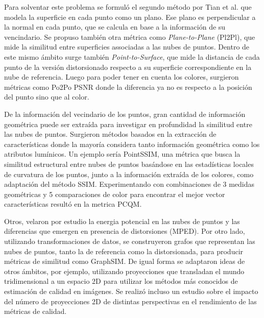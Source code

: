 Para solventar este problema se formuló el segundo método por Tian et al. 
que modela la superficie en cada punto como un plano. 
Ese plano es perpendicular a la normal en cada punto, que se calcula en base a la información de su vencindario. 
Se propuso también otra métrica como \emph{Plane-to-Plane} (Pl2Pl)\cite{PlaneToPlane}, 
que mide la similitud entre superficies associadas a las nubes de puntos. Dentro 
de este mismo ámbito surge también \emph{Point-to-Surface}\cite{PlaneToSurface}, 
que mide la distancia de cada punto de la versión distorsionado respecto a su 
superficie correspondiente en la nube de referencia. Luego para poder tener en
cuenta los colores, surgieron métricas como Po2Po PSNR donde la diferencia 
ya no es respecto a la posición del punto sino que al color.

De la información del vecindario de los puntos, gran cantidad de información geométrica 
puede ser extraída para investigar en profundidad la similitud entre las nubes 
de puntos. Surgieron métodos basados en la extracción de características donde la 
mayoría considera tanto información geométrica como los atributos lumínicos.
Un ejemplo sería PointSSIM\cite{PointSSIM}, una métrica que busca la similitud estructural entre nubes de puntos basándose en
las estadísticas locales de curvatura de los puntos, junto a la información 
extraída de los colores, como adaptación del método SSIM\cite{SSIM}.
Experimentando con combinaciones de 3 medidas geométricas y 5 comparaciones de color 
para encontrar el mejor vector características resultó en la metrica PCQM\cite{PCQM}.

Otros, velaron por estudio la energia potencial en las nubes de puntos y 
las diferencias que emergen en presencia de distorsiones (MPED)\cite{MPED}.
Por otro lado, utilizando transformaciones de datos, se construyeron grafos que representan 
las nubes de puntos, tanto la de referencia como la distorsionada, 
para producir métricas de similitud como GraphSIM\cite{GraphSIM}.
De igual forma se adaptaron ideas de otros ámbitos, por ejemplo, utilizando 
proyecciones que transladan el mundo tridimensional a un espacio 2D para utilizar 
los métodos más conocidos de estimación de calidad en imágenes.
Se realizó incluso un estudio sobre el impacto del número de proyecciones 2D de 
distintas perspectivas en el rendimiento de las métricas de calidad\cite{ImpactOf2DProyections, IT-PCQA}.

